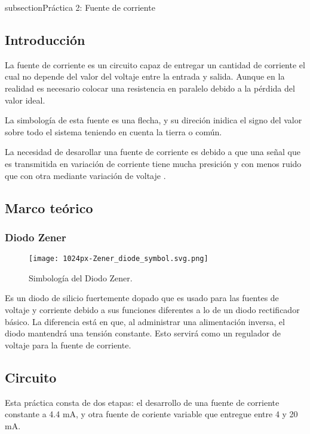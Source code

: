 \clearpage

subsection{Práctica 2: Fuente de corriente}



\subsection{Introducción}
La fuente de corriente es un circuito capaz de entregar un cantidad de corriente el cual no depende del valor del voltaje entre la entrada y salida. Aunque en la realidad es necesario colocar una resistencia en paralelo debido a la pérdida del valor ideal.

La simbología de esta fuente es una flecha, y su direción inidica el signo del valor sobre todo el sistema teniendo en cuenta la tierra o común.

La necesidad de desarollar una fuente de corriente es debido a que una señal que es transmitida en variación de corriente tiene mucha presición y con menos ruido que con otra mediante variación de voltaje \parencite{routimo2007comparison}.

\subsection{Marco teórico}
\subsubsection*{Diodo Zener}

\begin{figure}[h]
    \centering
    \texttt{[image: 1024px-Zener\_diode\_symbol.svg.png]}    
    \caption{Simbología del Diodo Zener.}
    \label{Fig: Simbologia del Diodo Zener}
\end{figure}


Es un diodo de silicio fuertemente dopado que es usado para las fuentes de voltaje y corriente debido a sus funciones 
diferentes a lo de un diodo rectificador básico. La diferencia está en que, al administrar una alimentación inversa, 
el diodo mantendrá una tensión constante. Esto servirá como un regulador de voltaje para la fuente de corriente.

\subsection{Circuito}
Esta práctica consta de dos etapas: el desarrollo de una fuente de corriente constante a 4.4 mA, y otra fuente
 de coriente variable que entregue entre 4 y 20 mA.

